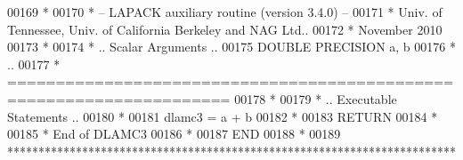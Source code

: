 \begin{DoxyCode}
00169 \textcolor{comment}{*}
00170 \textcolor{comment}{*  -- LAPACK auxiliary routine (version 3.4.0) --}
00171 \textcolor{comment}{*     Univ. of Tennessee, Univ. of California Berkeley and NAG Ltd..}
00172 \textcolor{comment}{*     November 2010}
00173 \textcolor{comment}{*}
00174 \textcolor{comment}{*     .. Scalar Arguments ..}
00175       \textcolor{keywordtype}{DOUBLE PRECISION}   a, b
00176 \textcolor{comment}{*     ..}
00177 \textcolor{comment}{* =====================================================================}
00178 \textcolor{comment}{*}
00179 \textcolor{comment}{*     .. Executable Statements ..}
00180 \textcolor{comment}{*}
00181       dlamc3 = a + b
00182 \textcolor{comment}{*}
00183       \textcolor{keywordflow}{RETURN}
00184 \textcolor{comment}{*}
00185 \textcolor{comment}{*     End of DLAMC3}
00186 \textcolor{comment}{*}
00187 \textcolor{keyword}{      END}
00188 \textcolor{comment}{*}
00189 \textcolor{comment}{************************************************************************}
\end{DoxyCode}
